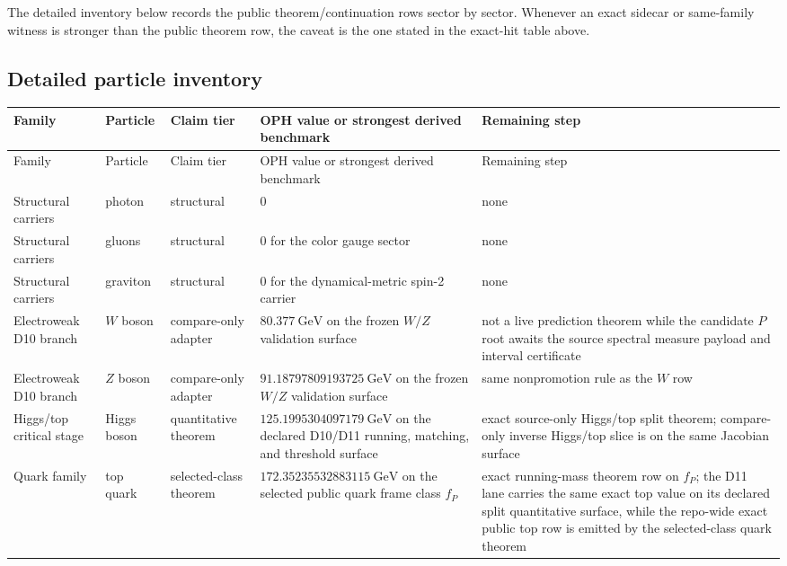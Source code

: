 \documentclass[11pt]{article}
\begin{document}
The detailed inventory below records the public theorem/continuation rows sector by sector. Whenever an exact sidecar or same-family witness is stronger than the public theorem row, the caveat is the one stated in the exact-hit table above.

\subsection{Detailed particle inventory}

\tiny
\setlength{\tabcolsep}{2pt}
\begin{longtable}{@{}>{\raggedright\arraybackslash}p{}>{\raggedright\arraybackslash}p{}>{\raggedright\arraybackslash}p{}>{\raggedright\arraybackslash}p{}>{\raggedright\arraybackslash}p{}@{}}
\toprule
Family & Particle & Claim tier & OPH value or strongest derived benchmark & Remaining step \\
\midrule
\endfirsthead
\toprule
Family & Particle & Claim tier & OPH value or strongest derived benchmark & Remaining step \\
\midrule
\endhead
\bottomrule
\endfoot
Structural carriers & photon & structural & \(0\) & none \\
Structural carriers & gluons & structural & \(0\) for the color gauge sector & none \\
Structural carriers & graviton & structural & \(0\) for the dynamical-metric spin-2 carrier & none \\
Electroweak D10 branch & \(W\) boson & compare-only adapter & \(80.377~\mathrm{GeV}\) on the frozen \(W/Z\) validation surface & not a live prediction theorem while the candidate \(P\) root awaits the source spectral measure payload and interval certificate \\
Electroweak D10 branch & \(Z\) boson & compare-only adapter & \(91.18797809193725~\mathrm{GeV}\) on the frozen \(W/Z\) validation surface & same nonpromotion rule as the \(W\) row \\
Higgs/top critical stage & Higgs boson & quantitative theorem & \(125.1995304097179~\mathrm{GeV}\) on the declared D10/D11 running, matching, and threshold surface & exact source-only Higgs/top split theorem; compare-only inverse Higgs/top slice is on the same Jacobian surface \\
Quark family & top quark & selected-class theorem & \(172.35235532883115~\mathrm{GeV}\) on the selected public quark frame class \(f_P\) & exact running-mass theorem row on \(f_P\); the D11 lane carries the same exact top value on its declared split quantitative surface, while the repo-wide exact public top row is emitted by the selected-class quark theorem \\

\end{longtable}
\end{document}
